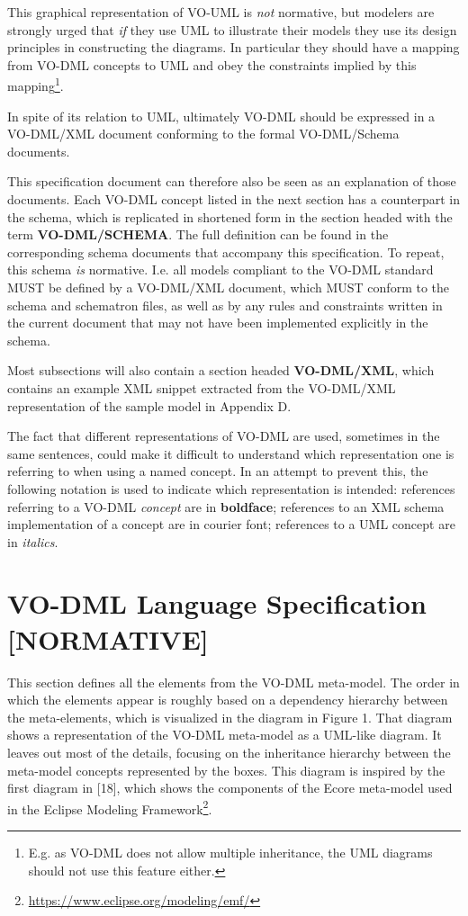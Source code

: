 \documentclass[10pt,a4paper]{ivoa}
\begin{document}
This graphical representation of VO-UML is \emph{not} normative, but
modelers are strongly urged that \emph{if} they use UML to illustrate
their models they use its design principles in constructing the
diagrams. In particular they should have a mapping from VO-DML concepts
to UML and obey the constraints implied by this mapping\footnote{E.g. as
  VO-DML does not allow multiple inheritance, the UML diagrams should
  not use this feature either.}.

In spite of its relation to UML, ultimately VO-DML should be expressed
in a VO-DML/XML document conforming to the formal VO-DML/Schema
documents.

This specification document can therefore also be seen as an explanation
of those documents. Each VO-DML concept listed in the next section has a
counterpart in the schema, which is replicated in shortened form in the
section headed with the term \textbf{VO-DML/SCHEMA}. The full definition
can be found in the corresponding schema documents that accompany this
specification. To repeat, this schema \emph{is} normative. I.e. all
models compliant to the VO-DML standard MUST be defined by a VO-DML/XML
document, which MUST conform to the schema and schematron files, as well
as by any rules and constraints written in the current document that may
not have been implemented explicitly in the schema.

Most subsections will also contain a section headed \textbf{VO-DML/XML},
which contains an example XML snippet extracted from the VO-DML/XML
representation of the sample model in Appendix D.

The fact that different representations of VO-DML are used, sometimes in
the same sentences, could make it difficult to understand which
representation one is referring to when using a named concept. In an
attempt to prevent this, the following notation is used to indicate
which representation is intended: references referring to a VO-DML
\emph{concept} are in \textbf{boldface}; references to an XML schema
implementation of a concept are in courier font; references to a UML
concept are in \emph{italics}.

\hypertarget{vo-dml-language-specification-normative}{%
\section{VO-DML Language Specification
{[}NORMATIVE{]}}\label{vo-dml-language-specification-normative}}

This section defines all the elements from the VO-DML meta-model. The
order in which the elements appear is roughly based on a dependency
hierarchy between the meta-elements, which is visualized in the diagram
in Figure 1. That diagram shows a representation of the VO-DML
meta-model as a UML-like diagram. It leaves out most of the details,
focusing on the inheritance hierarchy between the meta-model concepts
represented by the boxes. This diagram is inspired by the first diagram
in {[}18{]}, which shows the components of the Ecore meta-model used in
the Eclipse Modeling Framework\footnote{\url{https://www.eclipse.org/modeling/emf/}}.
\end{document}
